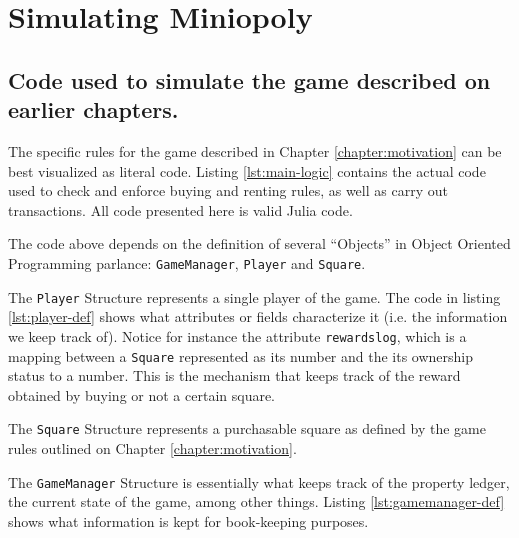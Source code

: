 \chapter{Simulating Miniopoly}
\label{appendix:MiniopolySim}

\section*{Code used to simulate the game described on earlier 
chapters.}

The specific rules for the game described in Chapter 
\ref{chapter:motivation} can be best visualized as literal 
code. Listing \ref{lst:main-logic} contains the actual code 
used to check and enforce buying and renting rules, as well as 
carry out transactions. All code presented here is valid Julia 
code.



The code above depends on the definition of several ``Objects'' 
in Object Oriented Programming parlance: 
\lstinline{GameManager}, \lstinline{Player} and 
\lstinline{Square}.

The \lstinline{Player} Structure represents a single player of 
the game. The code in listing \ref{lst:player-def} shows what 
attributes or fields characterize it (i.e. the information we 
keep track of). Notice for instance the attribute 
\lstinline{rewardslog}, which is a mapping between a 
\lstinline{Square} represented as its number and the its 
ownership status to a number. This is the mechanism that keeps 
track of the reward obtained by buying or not a certain square.



The \lstinline{Square} Structure represents a purchasable 
square as defined by the game rules outlined on Chapter 
\ref{chapter:motivation}. 



The \lstinline{GameManager} Structure is essentially what keeps 
track of the property ledger, the current state of the game, 
among other things. Listing \ref{lst:gamemanager-def} shows 
what information is kept for book-keeping purposes.


